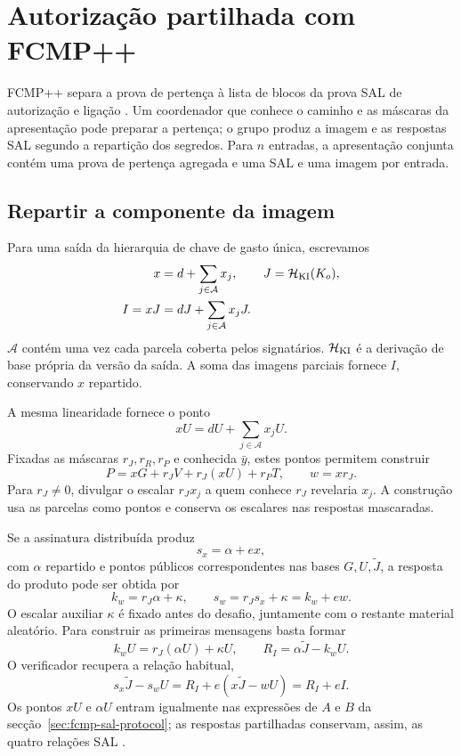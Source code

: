 \section{Autorização partilhada com FCMP++}
\label{sec:multisig-fcmp-note}

FCMP++ separa a prova de pertença à lista de blocos da prova SAL de
autorização e ligação \cite{fcmp-plus-plus-paper}. Um coordenador que conhece
o caminho e as máscaras da apresentação pode preparar a pertença; o grupo
produz a imagem e as respostas SAL segundo a repartição dos segredos. Para
\(n\) entradas, a apresentação conjunta contém uma prova de pertença
agregada e uma SAL e uma imagem por entrada.

\subsection{Repartir a componente da imagem}

Para uma saída da hierarquia de chave de gasto única, escrevamos
\begin{align*}
 x&=d+\sum_{j\in\mathcal A}x_j,&
 J&=\mathcal H_{\rm KI}(K_o),\\
 I=xJ&=dJ+\sum_{j\in\mathcal A}x_jJ.
\end{align*}
\(\mathcal A\) contém uma vez cada parcela coberta pelos signatários.
\(\mathcal H_{\rm KI}\) é a derivação de base própria da versão da saída.
A soma das imagens parciais fornece \(I\), conservando \(x\) repartido.

A mesma linearidade fornece o ponto
\[
 xU=dU+\sum_{j\in\mathcal A}x_jU.
\]
Fixadas as máscaras \(r_J,r_R,r_P\) e conhecida \(\bar y\), estes pontos
permitem construir
\[
 P=xG+r_JV+r_J(xU)+r_PT,
 \qquad w=xr_J.
\]
Para \(r_J\ne0\), divulgar o escalar \(r_Jx_j\) a quem conhece \(r_J\)
revelaria \(x_j\). A construção usa as parcelas como pontos e conserva os
escalares nas respostas mascaradas.

Se a assinatura distribuída produz
\[
 s_x=\alpha+ex,
\]
com \(\alpha\) repartido e pontos públicos correspondentes nas bases
\(G,U,\widetilde J\), a resposta do produto pode ser obtida por
\[
 k_w=r_J\alpha+\kappa,
 \qquad s_w=r_Js_x+\kappa=k_w+ew.
\]
O escalar auxiliar \(\kappa\) é fixado antes do desafio, juntamente com o
restante material aleatório. Para construir as primeiras mensagens basta
formar
\[
 k_wU=r_J(\alpha U)+\kappa U,
 \qquad R_I=\alpha\widetilde J-k_wU.
\]
O verificador recupera a relação habitual,
\[
 s_x\widetilde J-s_wU
 =R_I+e(x\widetilde J-wU)=R_I+eI.
\]
Os pontos \(xU\) e \(\alpha U\) entram igualmente nas expressões de
\(A\) e \(B\) da secção~\ref{sec:fcmp-sal-protocol}; as respostas partilhadas
conservam, assim, as quatro relações SAL
\cite{monero-oxide-fcmp-source}.

